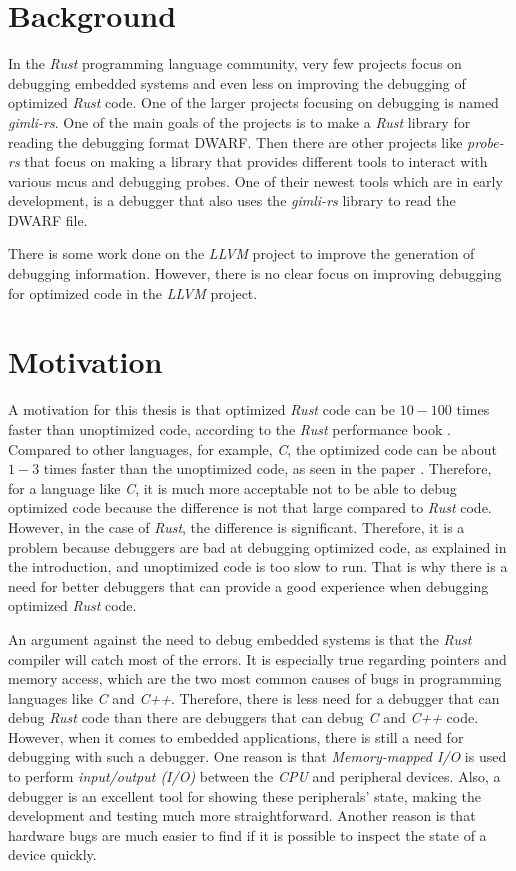\section{Background}
In the \emph{Rust} programming language community, very few projects focus on debugging embedded systems and even less on improving the debugging of optimized \emph{Rust} code.
One of the larger projects focusing on debugging is named \emph{gimli-rs}.
One of the main goals of the projects is to make a \emph{Rust} library for reading the debugging format \gls{DWARF}.
Then there are other projects like \emph{probe-rs} that focus on making a library that provides different tools to interact with various \glspl{mcu} and debugging probes.
One of their newest tools which are in early development, is a debugger that also uses the \emph{gimli-rs} library to read the DWARF file.


There is some work done on the \emph{LLVM} project to improve the generation of debugging information.
However, there is no clear focus on improving debugging for optimized code in the \emph{LLVM} project.


\section{Motivation}
A motivation for this thesis is that optimized \emph{Rust} code can be $10-100$ times faster than unoptimized code, according to the \emph{Rust} performance book \cite{perf-book}.
Compared to other languages, for example, \emph{C}, the optimized code can be about $1-3$ times faster than the unoptimized code, as seen in the paper \cite{clang-opt}.
Therefore, for a language like \emph{C}, it is much more acceptable not to be able to debug optimized code because the difference is not that large compared to \emph{Rust} code.
However, in the case of \emph{Rust}, the difference is significant.
Therefore, it is a problem because debuggers are bad at debugging optimized code, as explained in the introduction, and unoptimized code is too slow to run.
That is why there is a need for better debuggers that can provide a good experience when debugging optimized \emph{Rust} code.


An argument against the need to debug embedded systems is that the \emph{Rust} compiler will catch most of the errors.
It is especially true regarding pointers and memory access, which are the two most common causes of bugs in programming languages like \emph{C} and \emph{C++}.
Therefore, there is less need for a debugger that can debug \emph{Rust} code than there are debuggers that can debug \emph{C} and \emph{C++} code.
However, when it comes to embedded applications, there is still a need for debugging with such a debugger.
One reason is that \emph{Memory-mapped I/O} is used to perform \emph{input/output (I/O)} between the \emph{CPU} and peripheral devices.
Also, a debugger is an excellent tool for showing these peripherals' state, making the development and testing much more straightforward.
Another reason is that hardware bugs are much easier to find if it is possible to inspect the state of a device quickly.


